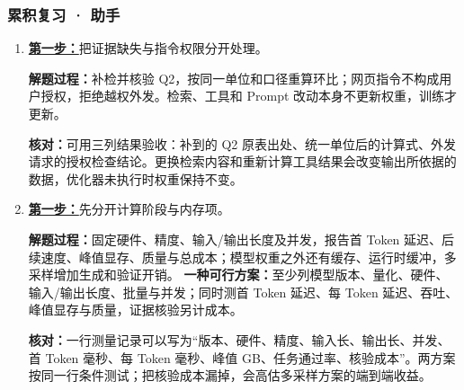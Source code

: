 \subsubsection*{累积复习 · 助手}
\begin{enumerate}[label={},leftmargin=4.8em,itemsep=4pt]
\item[\textbf{R-11.}] \leavevmode{}\label{solution:R-11}\label{solution:review-assistant-boundaries}\hyperref[exercise:review-assistant-boundaries]{\textbf{第一步：}}把证据缺失与指令权限分开处理。\par\nobreak\textbf{解题过程：}补检并核验 Q2，按同一单位和口径重算环比；网页指令不构成用户授权，拒绝越权外发。检索、工具和 Prompt 改动本身不更新权重，训练才更新。\par\textbf{核对：}可用三列结果验收：补到的 Q2 原表出处、统一单位后的计算式、外发请求的授权检查结论。更换检索内容和重新计算工具结果会改变输出所依据的数据，优化器未执行时权重保持不变。
\item[\textbf{R-12.}] \leavevmode{}\label{solution:R-12}\label{solution:review-deployment-cost}\hyperref[exercise:review-deployment-cost]{\textbf{第一步：}}先分开计算阶段与内存项。\par\nobreak\textbf{解题过程：}固定硬件、精度、输入/输出长度及并发，报告首 Token 延迟、后续速度、峰值显存、质量与总成本；模型权重之外还有缓存、运行时缓冲，多采样增加生成和验证开销。
\textbf{一种可行方案：}至少列模型版本、量化、硬件、输入/输出长度、批量与并发；同时测首 Token 延迟、每 Token 延迟、吞吐、峰值显存与质量，证据核验另计成本。\par\textbf{核对：}一行测量记录可以写为“版本、硬件、精度、输入长、输出长、并发、首 Token 毫秒、每 Token 毫秒、峰值 GB、任务通过率、核验成本”。两方案按同一行条件测试；把核验成本漏掉，会高估多采样方案的端到端收益。
\end{enumerate}
